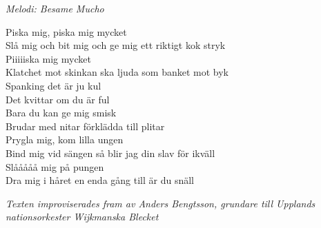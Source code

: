 {\footnotesize\textit{Melodi: Besame Mucho}}\par
\vspace{10pt}
Piska mig, piska mig mycket\\
Slå mig och bit mig och ge mig ett riktigt kok stryk\\
Piiiiiska mig mycket\\
Klatchet mot skinkan ska ljuda som banket mot byk\\
Spanking det är ju kul\\
Det kvittar om du är ful\\
Bara du kan ge mig smisk\\
Brudar med nitar förklädda till plitar\\
Prygla mig, kom lilla ungen\\
Bind mig vid sängen så blir jag din slav för ikväll\\
Slååååå mig på pungen\\
Dra mig i håret en enda gång till är du snäll\par
\vspace{10pt}
{\footnotesize\textit{Texten improviserades fram av Anders Bengtsson, grundare till Upplands nationsorkester Wijkmanska Blecket}}
